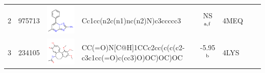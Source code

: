\documentclass[aps,pre,twocolumn,nofootinbib,superscriptaddress,10pt, final,tightenlines]{revtex4-1}
\begin{document}
\begin{table}
\begin{center}
\begin{tabular}{llp{2cm}>{\ttfamily}lS[table-format=-1.2, table-figures-uncertainty=1]ll}
2        & 975713                                 & \parbox[c]{1em}{\includegraphics[scale=0.15]{figures/new-bromo/975713.pdf}}   & Cc1cc(n2c(n1)nc(n2)N)c3ccccc3                                    & NS$^{\rm a,f}$                                    & 4MEQ~\cite{Vidler:2013:J.Med.Chem.}        & ~\cite{Vidler:2013:J.Med.Chem.}         \\ 
3        & 234105                                 & \parbox[c]{1em}{\includegraphics[scale=0.15]{figures/new-bromo/234105.pdf}}   & CC(=O)N[C@H]1CCc2cc(c(c(c2-c3c1cc(=O)c(cc3)O)OC)OC)OC            & -5.95$^{\rm b}$                                      & 4LYS~~\cite{Lucas:2013:Angew.Chem.Int.Ed.} & ~\cite{Lucas:2013:Angew.Chem.Int.Ed.}   \\ 

\end{tabular}
\end{center}
\end{table}
\end{document}
